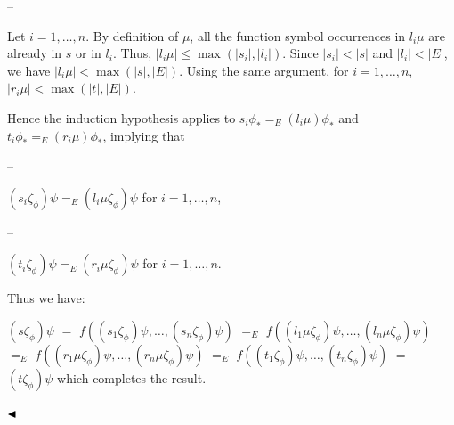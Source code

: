  
 
\par\noindent  – 
 
Let $i=1,\dots,n$. By definition of $\mu$, all the function symbol occurrences in $l_{i}\mu$ are already in $s$ or in $l_{i}$. Thus, $|l_{i}\mu|\leq\max(|s_{i}|,|l_{i}|)$. Since $|s_{i}|<|s|$ and $|l_{i}|<|E|$, we have $|l_{i}\mu|<\max(|s|,|E|)$. Using the same argument, for $i=1,\dots,n$, $|r_{i}\mu|<\max(|t|,|E|)$.\par
 
 
  
Hence the induction hypothesis applies to $s_{i}\phi_{*}=_{E}(l_{i}\mu)\phi_{*}$ and $t_{i}\phi_{*}=_{E}(r_{i}\mu)\phi_{*}$, implying that\par
  
\par\noindent  – 
 
$(s_{i}\zeta_{\phi})\psi=_{E}(l_{i}\mu\zeta_{\phi})\psi$ for $i=1,\dots,n$,\par
 
 
 
\par\noindent  – 
 
$(t_{i}\zeta_{\phi})\psi=_{E}(r_{i}\mu\zeta_{\phi})\psi$ for $i=1,\dots,n$.\par
 
 
  
Thus we have:\par
     $\displaystyle(s\zeta_{\phi})\psi$ $\displaystyle=$ $\displaystyle f((s_{1}\zeta_{\phi})\psi,\dots,(s_{n}\zeta_{\phi})\psi)$      $\displaystyle=_{E}$ $\displaystyle f((l_{1}\mu\zeta_{\phi})\psi,\dots,(l_{n}\mu\zeta_{\phi})\psi)$      $\displaystyle=_{E}$ $\displaystyle f((r_{1}\mu\zeta_{\phi})\psi,\dots,(r_{n}\mu\zeta_{\phi})\psi)$      $\displaystyle=_{E}$ $\displaystyle f((t_{1}\zeta_{\phi})\psi,\dots,(t_{n}\zeta_{\phi})\psi)$      $\displaystyle=$ $\displaystyle(t\zeta_{\phi})\psi$     
which completes the result.\par
 
 
  
 
 
$\hfill\blacktriangleleft$\par
 
